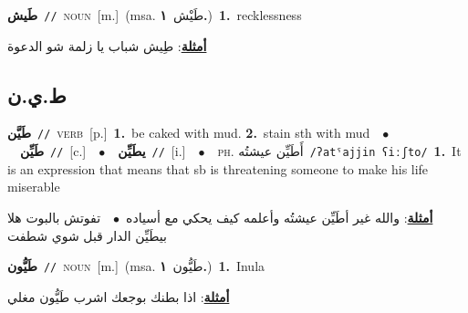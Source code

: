 \documentclass[10pt,a4paper,twoside]{article} %
\begin{document}
\begin{multicols}{2}
{\setlength\topsep{0pt}\textbf{\foreignlanguage{arabic}{طَيش}}\ {\color{gray}\texttt{//}\color{black}}\ \textsc{noun}\ [m.]\ \color{gray}(msa. \foreignlanguage{arabic}{طَيْش}~\foreignlanguage{arabic}{\textbf{١.}})\color{black}\ \textbf{1.}~recklessness\  \begin{flushright}\color{gray}\foreignlanguage{arabic}{\textbf{\underline{\foreignlanguage{arabic}{أمثلة}}}: طِيش شباب يا زلمة شو الدعوة}\end{flushright}\color{black}} \vspace{2mm}

\vspace{-3mm}
\subsection*{\color{blue}\foreignlanguage{arabic}{ط.ي.ن}\color{blue}{}} 

{\setlength\topsep{0pt}\textbf{\foreignlanguage{arabic}{طَيَّن}}\ {\color{gray}\texttt{//}\color{black}}\ \textsc{verb}\ [p.]\ \textbf{1.}~be caked with mud.  \textbf{2.}~stain sth with mud\ \ $\bullet$\ \ \setlength\topsep{0pt}\textbf{\foreignlanguage{arabic}{طَيِّن}}\ {\color{gray}\texttt{//}\color{black}}\ [c.]\ \ $\bullet$\ \ \setlength\topsep{0pt}\textbf{\foreignlanguage{arabic}{يطَيِّن}}\ {\color{gray}\texttt{//}\color{black}}\ [i.]\ \ $\bullet$\ \ \textsc{ph.} \color{gray} \foreignlanguage{arabic}{أَطَيِّن عيشتُه}\color{black}\ {\color{gray}\texttt{/{\sffamily ʔatˤajjin ʕiːʃto}/}\color{black}}\ \textbf{1.}~It is an expression that means that sb is threatening someone to make his life miserable\  \begin{flushright}\color{gray}\foreignlanguage{arabic}{\textbf{\underline{\foreignlanguage{arabic}{أمثلة}}}: والله غير أطَيِّن عيشتُه وأعلمه كيف يحكي مع أسياده\ $\bullet$\ \  تفوتش بالبوت هلا بيطَيِّن الدار قبل شوي شطفت}\end{flushright}\color{black}} \vspace{2mm}

{\setlength\topsep{0pt}\textbf{\foreignlanguage{arabic}{طَيُّون}}\ {\color{gray}\texttt{//}\color{black}}\ \textsc{noun}\ [m.]\ \color{gray}(msa. \foreignlanguage{arabic}{طَيُّون}~\foreignlanguage{arabic}{\textbf{١.}})\color{black}\ \textbf{1.}~Inula\  \begin{flushright}\color{gray}\foreignlanguage{arabic}{\textbf{\underline{\foreignlanguage{arabic}{أمثلة}}}: اذا بطنك بوجعك اشرب طَيُّون مغلي}\end{flushright}\color{black}} \vspace{2mm}


\end{multicols}
\end{document}

